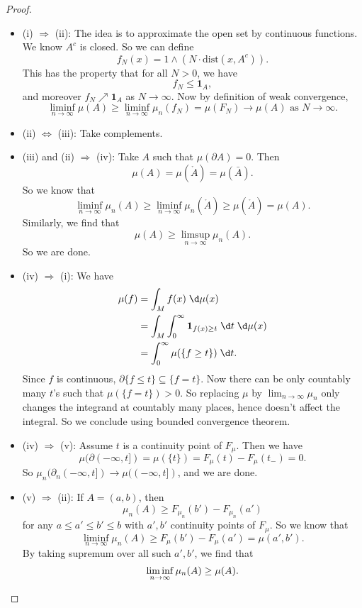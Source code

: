 \documentclass[a4paper]{article}
\begin{document}
\begin{proof}\leavevmode
  \begin{itemize}
    \item (i) $\Rightarrow$ (ii): The idea is to approximate the open set by continuous functions. We know $A^c$ is closed. So we can define
      \[
        f_N(x) = 1 \wedge (N \cdot \mathrm{dist}(x, A^c)).
      \]
      This has the property that for all $N > 0$, we have
      \[
        f_N \leq \mathbf{1}_A,
      \]
      and moreover $f_N \nearrow \mathbf{1}_A$ as $N \to \infty$. Now by definition of weak convergence,
      \[
        \liminf_{n \to \infty} \mu(A)\geq \liminf_{n \to \infty} \mu_n(f_N) = \mu(F_N) \to \mu(A)\text{ as }N \to \infty.
      \]
    \item (ii) $\Leftrightarrow$ (iii): Take complements.
    \item (iii) and (ii) $\Rightarrow$ (iv): Take $A$ such that $\mu(\partial A) = 0$. Then
      \[
        \mu(A) = \mu(\mathring{A}) = \mu(\bar{A}).
      \]
      So we know that
      \[
        \liminf_{n \to \infty} \mu_n(A) \geq \liminf_{n \to \infty} \mu_n(\mathring{A}) \geq \mu(\mathring{A}) = \mu(A).
      \]
      Similarly, we find that
      \[
        \mu(A) \geq \limsup_{n \to \infty} \mu_n(A).
      \]
      So we are done.
    \item (iv) $\Rightarrow$ (i): We have
      \begin{align*}
        \mu(f) &= \int_M f(x) \;\d \mu(x)\\
        &= \int_M \int_0^\infty \mathbf{1}_{f(x) \geq t}\;\d t \;\d \mu(x)\\
        &= \int_0^\infty \mu(\{f \geq t\})\;\d t.
      \end{align*}
      Since $f$ is continuous, $\partial \{f \leq t\} \subseteq \{f = t\}$. Now there can be only countably many $t$'s such that $\mu(\{f = t\}) > 0$. So replacing $\mu$ by $\lim_{n \to \infty}\mu_n$ only changes the integrand at countably many places, hence doesn't affect the integral. So we conclude using bounded convergence theorem.

    \item (iv) $\Rightarrow$ (v): Assume $t$ is a continuity point of $F_\mu$. Then we have
      \[
        \mu(\partial(-\infty, t]) = \mu(\{t\}) = F_\mu(t) - F_\mu(t_-) = 0.
      \]
      So $\mu_n(\partial_n(-\infty, t]) \to \mu((-\infty, t])$, and we are done.
    \item (v) $\Rightarrow$ (ii): If $A = (a, b)$, then
      \[
        \mu_n(A) \geq F_{\mu_n} (b') - F_{\mu_n}(a')
      \]
      for any $a \leq a' \leq b' \leq b$ with $a', b'$ continuity points of $F_\mu$. So we know that
      \[
        \liminf_{n \to \infty} \mu_n(A) \geq F_\mu(b') - F_\mu(a') = \mu(a', b').
      \]
      By taking supremum over all such $a', b'$, we find that
      \[
        \liminf_{n \to \infty} \mu_n(A) \geq \mu(A).\qedhere
      \]
  \end{itemize}
\end{proof}
\end{document}
